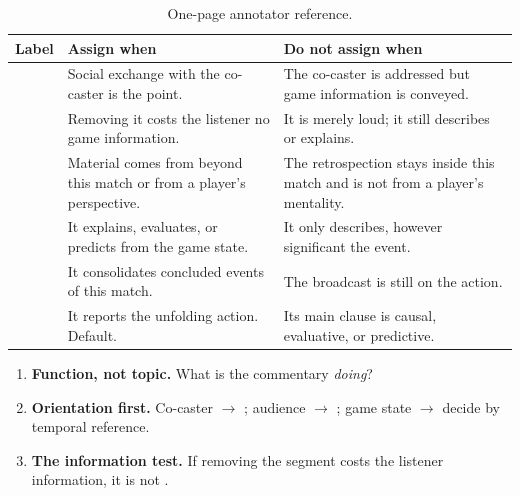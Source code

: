 \begin{table}[htbp]
\centering
\small
\caption{One-page annotator reference.}
\label{tab:quickref}
\renewcommand{\arraystretch}{1.4}
\begin{tabularx}{\textwidth}{@{}l X X@{}}
\toprule
\textbf{Label} & \textbf{Assign when} & \textbf{Do not assign when} \\
\midrule
\cBAN{} & Social exchange with the co-caster is the point. & The co-caster is addressed but game information is conveyed. \\
\cHYP{} & Removing it costs the listener no game information. & It is merely loud; it still describes or explains. \\
\cSTO{} & Material comes from beyond this match or from a player's perspective. & The retrospection stays inside this match and is not from a player's mentality. \\
\cSA{}  & It explains, evaluates, or predicts from the game state. & It only describes, however significant the event. \\
\cREC{} & It consolidates concluded events of this match. & The broadcast is still on the action. \\
\cPBP{} & It reports the unfolding action. Default. & Its main clause is causal, evaluative, or predictive. \\
\bottomrule
\end{tabularx}
\end{table}

\begin{agrulebox}
\begin{enumerate}[leftmargin=2.2em]
  \item \textbf{Function, not topic.} What is the commentary \emph{doing}?
  \item \textbf{Orientation first.} Co-caster $\rightarrow$ \BAN{};
    audience $\rightarrow$ \HYP{}; game state $\rightarrow$ decide by
    temporal reference.
  \item \textbf{The information test.} If removing the segment costs the
    listener information, it is not \HYP{}.
\end{enumerate}
\end{agrulebox}
